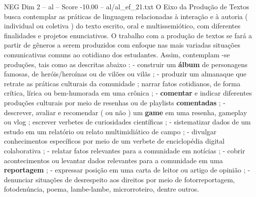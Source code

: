 \begin{textsample}{NEG Dim 2 – al – Score -10.00 – al/al\_ef\_21.txt}
O Eixo da Produção de Textos busca contemplar as práticas de linguagem relacionadas à interação e à autoria ( individual ou coletiva ) do texto escrito, oral e multissemiótico, com diferentes finalidades e projetos enunciativos.
O trabalho com a produção de textos se fará a partir de gêneros a serem produzidos com enfoque nas mais variadas situações comunicativas comuns ao cotidiano dos estudantes.
Assim, contemplam -se produções, tais como as descritas abaixo : - construir um \textbf{álbum} de personagens famosas, de heróis/heroínas ou de vilões ou vilãs ; - produzir um almanaque que retrate as práticas culturais da comunidade ; narrar fatos cotidianos, de forma crítica, lírica ou bem-humorada em uma crônica ; - \textbf{comentar} e indicar diferentes produções culturais por meio de resenhas ou de playlists \textbf{comentadas} ; - descrever, avaliar e recomendar ( ou não ) um \textbf{game} em uma resenha, gameplay ou vlog ; escrever verbetes de curiosidades científicas ; - sistematizar dados de um estudo em um relatório ou relato multimidiático de campo ; - divulgar conhecimentos específicos por meio de um verbete de enciclopédia digital colaborativa ; - relatar fatos relevantes para a comunidade em notícias ; - cobrir acontecimentos ou levantar dados relevantes para a comunidade em uma \textbf{reportagem} ; - expressar posição em uma carta de leitor ou artigo de opinião ; - denunciar situações de desrespeito aos direitos por meio de fotorreportagem, fotodenúncia, poema, lambe-lambe, microrroteiro, dentre outros.

\end{textsample}
